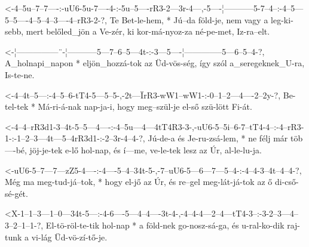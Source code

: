 

  {<-4--5u--7--7----:-uU6-5u-7----4-:-5u--5----rR3-2---3r-4---,-5----¦-----------5-7--4--:-4--5---5--5----4--5--4--3----4--rR3-2-?,}
  {  Te Bet-le-hem, * Jú--da föld-je, nem vagy a   leg-ki-sebb, mert belőled_jön a Ve-zér, ki kor-má-nyoz-za né-pe-met, Iz-ra--elt.}

  {<-¦---------------¨-¦-----------5---7--6--5---4t-:-3---5----¦--------------5---6--5--4-?,}
  {  A_holnapi_napon * eljön_hozzá-tok az Üd-vös-ség, így szól a_seregeknek_U-ra, Is-te-ne.}

  {<-4--4t--5---:-4--5--6-tT4-5---5--5-,-2t---ÏrR3-wW1--wW1-:-0--1--2---4----2--2y-?,}
  {  Be-tel-tek * Má-ri-á-nak nap-ja-i,  hogy meg--szül-je    el-ső szü-lött Fi-át.}


  {<-4--4--rR3d1-3--4t-5--5---4----:-4--5u---4---4tT4R3-3-,-uU6-5--5i--6-7--tT4-4--:-4--rR3-1-:-1--2--3---4t---5--4rR3d1-:-2--3r-4--4-?,}
  {  Jú-de-a     és Je-ru-zsá-lem, * ne félj már töb----bé, jöj-je-tek e-lő hol-nap, és í---me, ve-le-tek lesz az Úr,      al-le-lu-ja.}


  {<-uU6-5--7---7---zZ5-4----:-4----5--4--34t-5-,-7--uU6-5---6---7---5--4-:-4--4-3--4t--4--4-?,}
  {  Még ma meg-tud-já--tok, * hogy el-jő az  Úr, és re--gel meg-lát-já-tok az ő di-cső-sé-gét.}


  {<X-1--1--3---1--0---34t-5---:-4-6----5---4--4----3t-4-,-4--4-4---2--4---tT4-3--:-3-2--3---4--3--2--1--1-?,}
  {   El-tö-röl-te-tik hol-nap * a föld-nek go-nosz-sá-ga, és u-ral-ko-dik raj-tunk a vi-lág Üd-vö-zí-tő-je.}